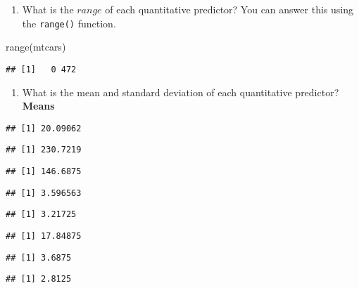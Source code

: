 \documentclass[
]{article}
\newenvironment{Shaded}{\begin{snugshade}}{\end{snugshade}}
\newcommand{\FunctionTok}[1]{\textcolor[rgb]{0.00,0.00,0.00}{#1}}
\newcommand{\NormalTok}[1]{#1}
\providecommand{\tightlist}{%
  \setlength{\itemsep}{0pt}\setlength{\parskip}{0pt}}
\begin{document}
\begin{enumerate}
\def\labelenumi{(\alph{enumi})}
\setcounter{enumi}{1}
\tightlist
\item
  What is the \(range\) of each quantitative predictor? You can answer
  this using the \texttt{range()} function.
\end{enumerate}

\begin{Shaded}
\begin{Highlighting}[]
\FunctionTok{range}\NormalTok{(mtcars)}
\end{Highlighting}
\end{Shaded}

\begin{verbatim}
## [1]   0 472
\end{verbatim}

\begin{enumerate}
\def\labelenumi{(\alph{enumi})}
\setcounter{enumi}{2}
\tightlist
\item
  What is the mean and standard deviation of each quantitative
  predictor?\\
  \textbf{Means}
\end{enumerate}

\begin{verbatim}
## [1] 20.09062
\end{verbatim}

\begin{verbatim}
## [1] 230.7219
\end{verbatim}

\begin{verbatim}
## [1] 146.6875
\end{verbatim}

\begin{verbatim}
## [1] 3.596563
\end{verbatim}

\begin{verbatim}
## [1] 3.21725
\end{verbatim}

\begin{verbatim}
## [1] 17.84875
\end{verbatim}

\begin{verbatim}
## [1] 3.6875
\end{verbatim}

\begin{verbatim}
## [1] 2.8125
\end{verbatim}
\end{document}
